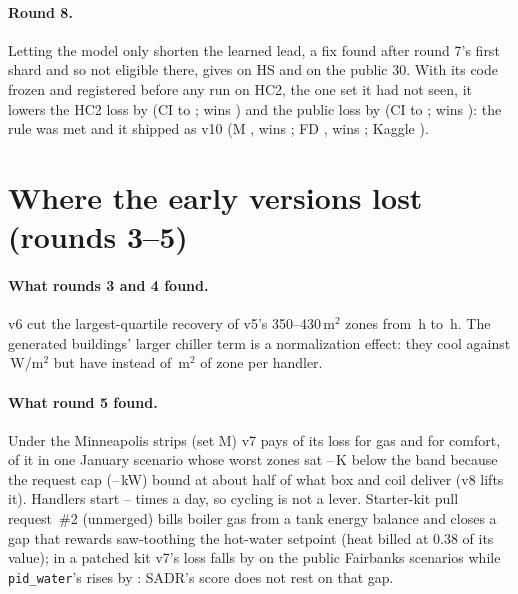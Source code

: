 \documentclass{article}
\begin{document}
\paragraph{Round 8.}
Letting the model only shorten the learned lead, a fix found after round 7's first shard and so not eligible there,
gives \RSevLedgerHsRel{} on HS and \RSevLedgerPubRel{} on the public 30. With its code frozen and registered before any
run on HC2, the one set it had not seen, it lowers the HC2 loss by \REigConfHarshCTwoRelAbs{} (CI
\REigConfHarshCTwoRelHiAbs{} to \REigConfHarshCTwoRelLoAbs; wins \REigConfHarshCTwoWins) and the public loss by
\REigConfPubRelAbs{} (CI \REigConfPubRelHiAbs{} to \REigConfPubRelLoAbs; wins \REigConfPubWins): the rule was met
and it shipped as v10 (M \REigConfMinnRel, wins \REigConfMinnWins; FD \REigConfFreshDefRel, wins
\REigConfFreshDefWins; Kaggle \REigKagVTen).

\section{Where the early versions lost (rounds 3--5)}
\label{app:diag}
\paragraph{What rounds 3 and 4 found.}
v6 cut the largest-quartile recovery of v5's 350--430\,m$^2$ zones from \DecHeldRVFiveRecoveryBig\,h to
\DecHeldROursRecoveryBig\,h. The generated buildings' larger chiller term is a normalization effect: they cool
\RFCoolWmRThree{} against \RFCoolWmPub\,W/m$^2$ but have \RFAreaPerAhuRThree{} instead of \RFAreaPerAhuPub\,m$^2$ of zone per handler.

\paragraph{What round 5 found.}
Under the Minneapolis strips (set M) v7 pays \RFiveDecMinnGasShare{} of its loss for gas and
\RFiveDecMinnComfortShare{} for comfort, \RFiveCapComfortShareOfMinn{} of it in one January scenario whose
\RFiveCapNZones{} worst zones sat \RFiveCapDefMin--\RFiveCapDefMax\,K below the band because the request cap
(\RFiveCapReqKwMin--\RFiveCapReqKwMax\,kW) bound at about half of what box and coil deliver (v8 lifts it). Handlers
start \RFiveAhuStartsMin--\RFiveAhuStartsMax{} times a day, so cycling is not a lever. Starter-kit pull request~\#2
(unmerged) bills boiler gas from a tank energy balance and closes a gap that rewards saw-toothing the hot-water
setpoint (heat billed at 0.38 of its value); in a patched kit v7's loss falls by \RFivePrTwoVSevenRelAbs{} on the
\RFivePrTwoVSevenN{} public Fairbanks scenarios while \texttt{pid\_water}'s rises by \RFivePrTwoPidRelAbs: SADR's score
does not rest on that gap.
\end{document}
